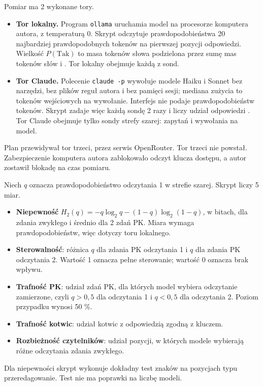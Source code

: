 Pomiar ma 2 wykonane tory.
\begin{itemize}[leftmargin=1.6em]
  \item \textbf{Tor lokalny.} Program \texttt{ollama} uruchamia model na procesorze
  komputera autora, z temperaturą 0. Skrypt odczytuje prawdopodobieństwa 20 najbardziej
  prawdopodobnych tokenów na pierwszej pozycji odpowiedzi. Wielkość $P(\text{Tak})$ to
  masa tokenów słowa  podzielona przez sumę mas tokenów słów 
  i . Tor lokalny obejmuje każdą z \pkProbesUnique{} sond.
  \item \textbf{Tor Claude.} Polecenie \texttt{claude -p} wywołuje modele Haiku i Sonnet
  bez narzędzi, bez plików reguł autora i bez pamięci sesji; mediana zużycia to
  \pkClaudeTokMedian{} tokenów wejściowych na wywołanie. Interfejs nie podaje prawdopodobieństw tokenów. Skrypt zadaje
  więc każdą sondę 2 razy i liczy udział odpowiedzi . Tor Claude obejmuje tylko
  sondy strefy szarej: \pkProbesGrayUnique{} zapytań i \pkClaudeCalls{} wywołania na model.
\end{itemize}
Plan przewidywał tor trzeci, przez serwis OpenRouter. Tor trzeci nie powstał. Zabezpieczenie
komputera autora zablokowało odczyt klucza dostępu, a autor zostawił blokadę na czas
pomiaru.

Niech $q$ oznacza prawdopodobieństwo odczytania 1 w strefie szarej. Skrypt liczy 5 miar.
\begin{itemize}[leftmargin=1.6em]
  \item \textbf{Niepewność} $H_2(q)=-q\log_2q-(1-q)\log_2(1-q)$, w bitach, dla zdania
  zwykłego i średnio dla 2 zdań PK. Miara wymaga prawdopodobieństw, więc dotyczy toru
  lokalnego.
  \item \textbf{Sterowalność}: różnica $q$ dla zdania PK odczytania 1 i $q$ dla zdania PK
  odczytania 2. Wartość 1 oznacza pełne sterowanie; wartość 0 oznacza brak wpływu.
  \item \textbf{Trafność PK}: udział zdań PK, dla których model wybiera odczytanie
  zamierzone, czyli $q>0{,}5$ dla odczytania 1 i $q<0{,}5$ dla odczytania 2. Poziom
  przypadku wynosi 50 \%.
  \item \textbf{Trafność kotwic}: udział kotwic z odpowiedzią zgodną z kluczem.
  \item \textbf{Rozbieżność czytelników}: udział pozycji, w których modele wybierają różne
  odczytania zdania zwykłego.
\end{itemize}
Dla niepewności skrypt wykonuje dokładny test znaków na pozycjach typu przeredagowanie.
Test nie ma poprawki na liczbę modeli.

